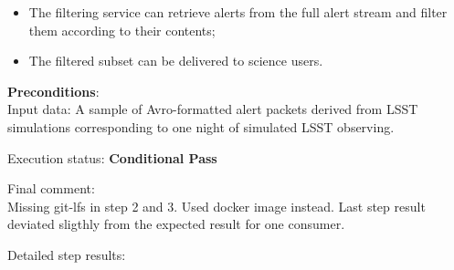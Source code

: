 \documentclass[DM,lsstdraft,STR,toc]{lsstdoc}
\providecommand{\tightlist}{
  \setlength{\itemsep}{0pt}\setlength{\parskip}{0pt}}
\begin{document}
\begin{itemize}
\tightlist
\item
  The filtering service can retrieve alerts from the full alert stream
  and filter them according to their contents; ~ ~
\item
  The filtered subset can be delivered to science users.
\end{itemize}


    {\bf Preconditions}:\\
    Input data: A sample of Avro-formatted alert packets derived from LSST
simulations corresponding to one night of simulated LSST observing.


    Execution status: {\bf Conditional Pass }

    Final comment:\\Missing git-lfs in step 2 and 3. Used docker image instead. Last step
result deviated sligthly from the expected result for one consumer.



    Detailed step results:
\end{document}
